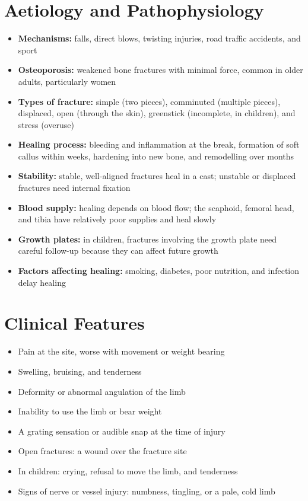 \section*{Aetiology and Pathophysiology}
\begin{itemize}
    \item \textbf{Mechanisms:} falls, direct blows, twisting injuries, road traffic accidents, and sport
    \item \textbf{Osteoporosis:} weakened bone fractures with minimal force, common in older adults, particularly women
    \item \textbf{Types of fracture:} simple (two pieces), comminuted (multiple pieces), displaced, open (through the skin), greenstick (incomplete, in children), and stress (overuse)
    \item \textbf{Healing process:} bleeding and inflammation at the break, formation of soft callus within weeks, hardening into new bone, and remodelling over months
    \item \textbf{Stability:} stable, well-aligned fractures heal in a cast; unstable or displaced fractures need internal fixation
    \item \textbf{Blood supply:} healing depends on blood flow; the scaphoid, femoral head, and tibia have relatively poor supplies and heal slowly
    \item \textbf{Growth plates:} in children, fractures involving the growth plate need careful follow-up because they can affect future growth
    \item \textbf{Factors affecting healing:} smoking, diabetes, poor nutrition, and infection delay healing
\end{itemize}

\section*{Clinical Features}
\begin{itemize}
    \item Pain at the site, worse with movement or weight bearing
    \item Swelling, bruising, and tenderness
    \item Deformity or abnormal angulation of the limb
    \item Inability to use the limb or bear weight
    \item A grating sensation or audible snap at the time of injury
    \item Open fractures: a wound over the fracture site
    \item In children: crying, refusal to move the limb, and tenderness
    \item Signs of nerve or vessel injury: numbness, tingling, or a pale, cold limb
\end{itemize}

